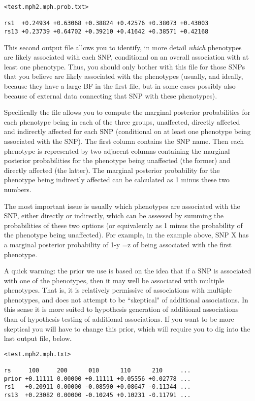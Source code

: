 \documentclass[11pt]{article}
\begin{document}
\begin{verbatim}
<test.mph2.mph.prob.txt>

rs1  +0.24934 +0.63068 +0.38824 +0.42576 +0.38073 +0.43003
rs13 +0.23739 +0.64702 +0.39210 +0.41642 +0.38571 +0.42168
\end{verbatim}
This second output file allows you to identify, in more detail {\it which} phenotypes are likely associated with each SNP, conditional on an overall association with at least one phenotype. Thus, you should only bother with this file for those SNPs that you believe are likely associated with the phenotypes (usually, and ideally, because they have a large BF in the first file, but in some cases possibly also because of external data connecting that SNP with these phenotypes).

Specifically the file allows you to compute the marginal posterior probabilities for each phenotype being in each of the three groups, unaffected, directly affected and indirectly affected for each SNP (conditional on at least one phenotype being associated with the SNP).
The first column contains the SNP name. 
Then each phenotype is represented by two adjacent columns containing the marginal posterior probabilities for the phenotype being unaffected (the former) and directly affected (the latter). 
The marginal posterior probability for the phenotype being indirectly affected can be calculated as 1 minus these two numbers.

The most important issue is usually which phenotypes are associated with the SNP, either directly or indirectly, which can be assessed by summing the probabilities of these two options (or equivalently as  1 minus the probability of the phenotype being unaffected).
For example, in the example above, SNP X has a marginal posterior probability of 1-y =z of being associated with the first phenotype.

A quick warning: the prior we use is based on the idea that if a SNP is associated with one of the phenotypes, then it may well be associated with multiple phenotypes. That is, it is relatively permissive of associations with multiple phenotypes,
and does not attempt to be ``skeptical" of additional associations. In this sense it is more suited to hypothesis generation of additional associations than of  hypothesis testing of additional associations. If you want to be more skeptical you will have to change this prior, which will require you to dig into the last output file, below.

\begin{verbatim}
<test.mph2.mph.txt>

rs     100     200      010      110      210     ...
prior +0.11111 0.00000 +0.11111 +0.05556 +0.02778 ...
rs1   +0.20911 0.00000 -0.08590 +0.08647 -0.11344 ...
rs13  +0.23082 0.00000 -0.10245 +0.10231 -0.11791 ...
\end{verbatim}
\end{document}
